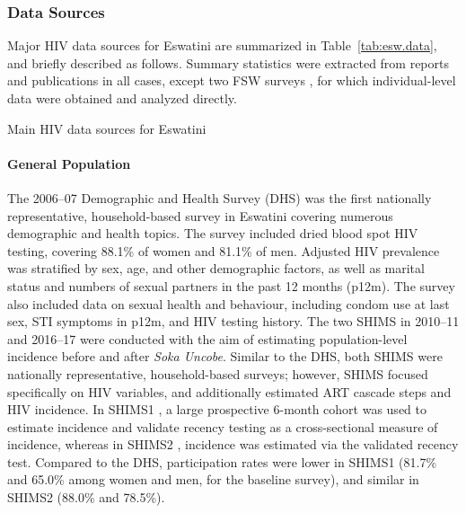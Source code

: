 \subsubsection{Data Sources}\label{intro.esw.hiv.data}
Major HIV data sources for Eswatini are summarized in Table~\ref{tab:esw.data},
and briefly described as follows.
Summary statistics were extracted from reports and publications in all cases,
except two FSW surveys \cite{Baral2014,EswKP2014},
for which individual-level data were obtained and analyzed directly.
\begin{table}
  \centering
  \caption{Main HIV data sources for Eswatini}
  \label{tab:esw.data}
  
\end{table}
\paragraph{General Population}
The 2006--07 Demographic and Health Survey (DHS) \cite{SDHS2006} was
the first nationally representative, household-based survey in Eswatini
covering numerous demographic and health topics.
The survey included dried blood spot HIV testing, covering 88.1\% of women and 81.1\% of men.
Adjusted HIV prevalence was stratified by sex, age, and other demographic factors, as well as
marital status and numbers of sexual partners in the past 12 months (p12m).
The survey also included data on sexual health and behaviour, including
condom use at last sex, STI symptoms in p12m, and HIV testing history.
The two SHIMS in 2010--11 \cite{SHIMS1} and 2016--17 \cite{SHIMS2} were conducted
with the aim of estimating population-level incidence before and after \emph{Soka Uncobe}.
Similar to the DHS, both SHIMS were nationally representative, household-based surveys;
however, SHIMS focused specifically on HIV variables, and additionally estimated
ART cascade steps and HIV incidence.
In SHIMS1 \cite{SHIMS1}, a large prospective 6-month cohort was used to estimate incidence
and validate recency testing \cite{Duong2012} as a cross-sectional measure of incidence, whereas
in SHIMS2 \cite{SHIMS2}, incidence was estimated via the validated recency test.
Compared to the DHS, participation rates were
lower in SHIMS1 (81.7\% and 65.0\% among women and men, for the baseline survey),
and similar in SHIMS2 (88.0\% and 78.5\%).
